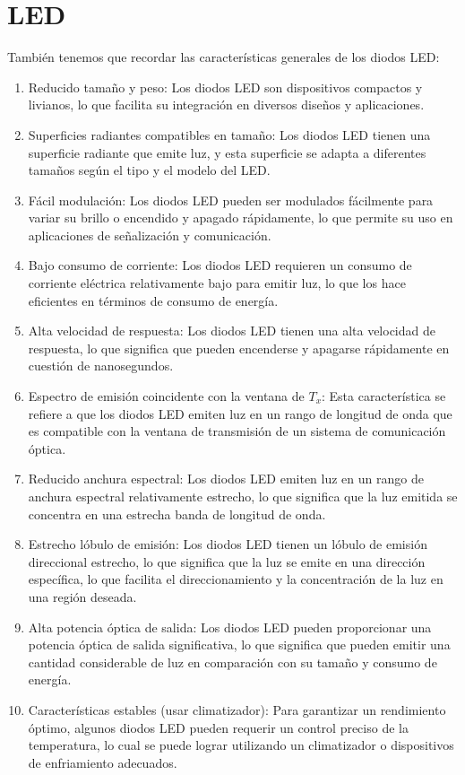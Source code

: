 \documentclass[
	12pt, %
	fleqn, %
	a4paper, %
	oneside, %
]{LegrandOrangeBook}
\begin{document}
\section{LED}
También tenemos que recordar las características generales de los diodos LED:
\begin{enumerate}
\item Reducido tamaño y peso: Los diodos LED son dispositivos compactos y livianos, lo que facilita su integración en diversos diseños y aplicaciones.
\item Superficies radiantes compatibles en tamaño: Los diodos LED tienen una superficie radiante que emite luz, y esta superficie se adapta a diferentes tamaños según el tipo y el modelo del LED.
\item Fácil modulación: Los diodos LED pueden ser modulados fácilmente para variar su brillo o encendido y apagado rápidamente, lo que permite su uso en aplicaciones de señalización y comunicación.
\item Bajo consumo de corriente: Los diodos LED requieren un consumo de corriente eléctrica relativamente bajo para emitir luz, lo que los hace eficientes en términos de consumo de energía.
\item Alta velocidad de respuesta: Los diodos LED tienen una alta velocidad de respuesta, lo que significa que pueden encenderse y apagarse rápidamente en cuestión de nanosegundos.
\item Espectro de emisión coincidente con la ventana de $T_x$: Esta característica se refiere a que los diodos LED emiten luz en un rango de longitud de onda que es compatible con la ventana de transmisión de un sistema de comunicación óptica.
\item Reducido anchura espectral: Los diodos LED emiten luz en un rango de anchura espectral relativamente estrecho, lo que significa que la luz emitida se concentra en una estrecha banda de longitud de onda.
\item Estrecho lóbulo de emisión: Los diodos LED tienen un lóbulo de emisión direccional estrecho, lo que significa que la luz se emite en una dirección específica, lo que facilita el direccionamiento y la concentración de la luz en una región deseada.
\item Alta potencia óptica de salida: Los diodos LED pueden proporcionar una potencia óptica de salida significativa, lo que significa que pueden emitir una cantidad considerable de luz en comparación con su tamaño y consumo de energía.
\item Características estables (usar climatizador): Para garantizar un rendimiento óptimo, algunos diodos LED pueden requerir un control preciso de la temperatura, lo cual se puede lograr utilizando un climatizador o dispositivos de enfriamiento adecuados.
\end{enumerate}
\end{document}
